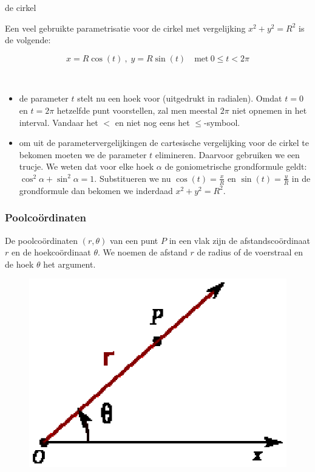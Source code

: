 \begin{voorbeeld}
	de cirkel

Een veel gebruikte parametrisatie voor de cirkel met vergelijking
$x^{2}+y^{2}=R^{2}$ is de volgende:

\begin{equation*}
x=R\cos(t)\:,\;y=R\sin(t)\quad\textrm{met}\:0\leq t<2\pi
\end{equation*}

\begin{opmerking}
	\ \\
	\begin{itemize}
\item de parameter $t$ stelt nu een hoek voor (uitgedrukt in radialen).
Omdat $t=0$ en $t=2\pi$ hetzelfde punt voorstellen, zal men meestal
$2\pi$ niet opnemen in het interval. Vandaar het $<$ en niet nog
eens het $\leq$-symbool.
\item om uit de parametervergelijkingen de cartesische vergelijking voor
de cirkel te bekomen moeten we de parameter $t$ elimineren. Daarvoor
gebruiken we een trucje. We weten dat voor elke hoek $\alpha$ de
goniometrische grondformule geldt: $\cos^{2}\alpha+\sin^{2}\alpha=1$.
Substitueren we nu $\cos(t)=\frac{x}{R}$ en $\sin(t)=\frac{y}{R}$
in de grondformule dan bekomen we inderdaad $x^{2}+y^{2}=R^{2}$.
\end{itemize}

\end{opmerking}
\end{voorbeeld}


\subsubsection{Poolco\"ordinaten}

De poolco\"ordinaten $\left(r,\theta\right)$ van een punt $P$ in een
vlak zijn de afstandsco\"ordinaat $r$ en de hoekco\"ordinaat $\theta$.
We noemen de afstand $r$ de radius of de voerstraal en de hoek $\theta$
het argument.

\begin{figure}
\centering
\includegraphics{2_elem_rekenvaardigheden_B/inputs/Poolcoordinaten_wikipedia}
\end{figure}

